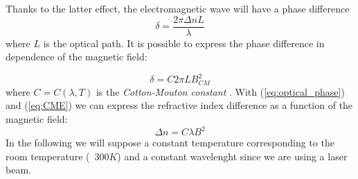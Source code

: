 \documentclass[11pt,a4paper]{article}
\begin{document}
Thanks to the latter effect, the electromagnetic wave will have a phase difference
\begin{equation}\label{eq:optical_phase}
\delta=\frac{2\pi \Delta n L}{\lambda}
\end{equation}
where $L$ is the optical path. It is possible to express the phase difference in dependence of the magnetic field:

\begin{equation}\label{eq:CME}
\delta=C2\pi L B_{CM}^2
\end{equation}
where $C=C(\lambda,T)$ is the \emph{Cotton-Mouton constant} \cite{wilson1997simple}. With (\ref{eq:optical_phase}) and (\ref{eq:CME}) we can express the refractive index difference as a function of the magnetic field:
\begin{equation}\label{eq:Delta_n}
\Delta n=C\lambda B^2
\end{equation} In the following we will suppose a constant temperature corresponding to the room temperature (~$300K$) and a constant wavelenght since we are using a laser beam.
\end{document}
